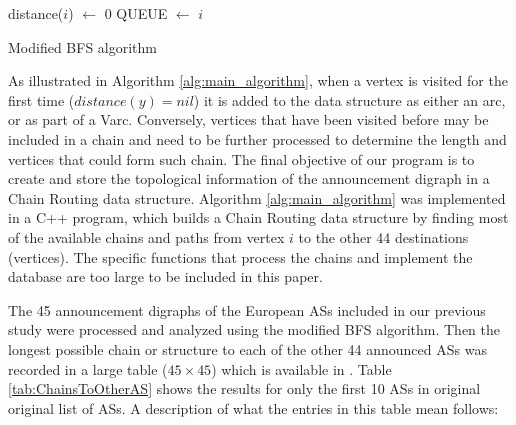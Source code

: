 \documentclass[5p,twocolumn]{elsarticle}
\begin{document}
\begin{algorithm}[!t]
	\SetAlgoNoLine
\BlankLine

	\BlankLine

	distance($i$) $\leftarrow$ 0\;
	QUEUE $\leftarrow$ $i$\;
	\BlankLine


	\caption{Modified BFS algorithm}
	\label{alg:main_algorithm}
\end{algorithm}

As illustrated in Algorithm \ref{alg:main_algorithm}, when a vertex is visited for the first time ($distance(y) = nil$) it is added to the data structure as either an arc, or as part of a Varc. Conversely, vertices that have been visited before may be included in a chain and need to be further processed to determine the length and vertices that could form such chain. The final objective of our program is to create and store the topological information of the announcement digraph in a Chain Routing data structure. Algorithm \ref{alg:main_algorithm} was implemented in a C++ program, which builds a Chain Routing data structure by finding most of the available chains and paths from vertex $i$ to the other 44 destinations (vertices). The specific functions that process the chains and implement the database are too large to be included in this paper.



The 45 announcement digraphs of the European ASs included in our previous study \cite{Arjona-Villicana2009} were processed and analyzed using the modified BFS algorithm. Then the longest possible chain or structure to each of the other 44 announced ASs was recorded in a large table ($45 \times 45$) which is available in \cite{Arjona-Villicana2010a}. Table \ref{tab:ChainsToOtherAS} shows the results for only the first 10 ASs in original original list of ASs. A description of what the entries in this table mean follows:
\end{document}
